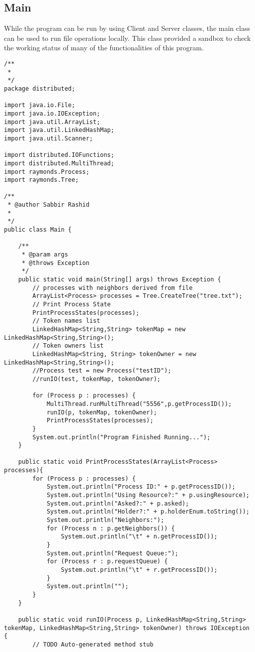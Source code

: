 \documentclass{article}
\begin{document}
	\subsection{Main}
	While the program can be run by using Client and Server classes, the main class can be used to run file operations locally. This class provided a sandbox to check the working status of many of the functionalities of this program.
		\begin{lstlisting}
/**
 * 
 */
package distributed;

import java.io.File;
import java.io.IOException;
import java.util.ArrayList;
import java.util.LinkedHashMap;
import java.util.Scanner;

import distributed.IOFunctions;
import distributed.MultiThread;
import raymonds.Process;
import raymonds.Tree;

/**
 * @author Sabbir Rashid
 *
 */
public class Main {

	/**
	 * @param args
	 * @throws Exception 
	 */
	public static void main(String[] args) throws Exception {
		// processes with neighbors derived from file
		ArrayList<Process> processes = Tree.CreateTree("tree.txt");
		// Print Process State
		PrintProcessStates(processes);
		// Token names list
		LinkedHashMap<String,String> tokenMap = new LinkedHashMap<String,String>();
		// Token owners list
		LinkedHashMap<String, String> tokenOwner = new LinkedHashMap<String,String>();
		//Process test = new Process("testID");
		//runIO(test, tokenMap, tokenOwner);
		
		for (Process p : processes) {
			MultiThread.runMultiThread("5556",p.getProcessID());
			runIO(p, tokenMap, tokenOwner);
			PrintProcessStates(processes);
		}
		System.out.println("Program Finished Running...");
	}

	public static void PrintProcessStates(ArrayList<Process> processes){
		for (Process p : processes) {
			System.out.println("Process ID:" + p.getProcessID());
			System.out.println("Using Resource?:" + p.usingResource);
			System.out.println("Asked?:" + p.asked);
			System.out.println("Holder?:" + p.holderEnum.toString());
			System.out.println("Neighbors:");
			for (Process n : p.getNeighbors()) {
				System.out.println("\t" + n.getProcessID());
			}
			System.out.println("Request Queue:");
			for (Process r : p.requestQueue) {
				System.out.println("\t" + r.getProcessID());
			}
			System.out.println("");
		}
	}
	
	public static void runIO(Process p, LinkedHashMap<String,String> tokenMap, LinkedHashMap<String,String> tokenOwner) throws IOException {
		// TODO Auto-generated method stub
		

\end{lstlisting}
\end{document}
